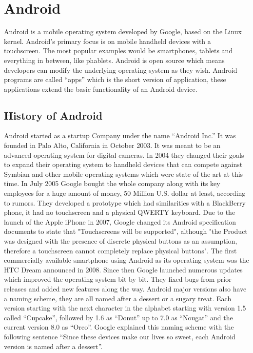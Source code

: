 \chapter{Android}
\label{ch:Android}
Android is a mobile operating system developed by Google, based on the Linux kernel. Android's primary focus is on mobile handheld devices with a touchscreen. The most popular examples would be smartphones, tablets and everything in between, like phablets. Android is open source which means developers can modify the underlying operating system as they wish. Android programs are called ``apps'' which is the short version of application, these applications extend the basic functionality of an Android device.

\section{History of Android}
Android started as a startup Company under the name ``Android Inc.'' It was founded in Palo Alto, California in October 2003. It was meant to be an advanced operating system for digital cameras. In 2004 they changed their goals to expand their operating system to handheld devices that can compete against Symbian and other mobile operating systems which were state of the art at this time. In July 2005 Google bought the whole company along with its key employees for a huge amount of money, 50 Million U.S. dollar at least, according to rumors. They developed a prototype which had similarities with a BlackBerry phone, it had no touchscreen and a physical QWERTY keyboard. Due to the launch of the Apple iPhone in 2007, Google changed its Android specification documents to state that "Touchscreens will be supported", although "the Product was designed with the presence of discrete physical buttons as an assumption, therefore a touchscreen cannot completely replace physical buttons". The first commercially available smartphone using Android as its operating system was the HTC Dream announced in 2008. Since then Google launched numerous updates which improved the operating system bit by bit. They fixed bugs from prior releases and added new features along the way. Android major versions also have a naming scheme, they are all named after a dessert or a sugary treat. Each version starting with the next character in the alphabet starting with version 1.5 called ``Cupcake'', followed by 1.6 as ``Donut'' up to 7.0 as ``Nougat'' and the current version 8.0 as ``Oreo''. Google explained this naming scheme with the following sentence ``Since these devices make our lives so sweet, each Android version is named after a dessert''.

